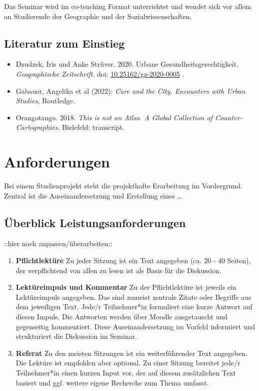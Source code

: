 \documentclass[
  ngerman,
]{article}
\providecommand{\tightlist}{%
  \setlength{\itemsep}{0pt}\setlength{\parskip}{0pt}}
\begin{document}
Das Seminar wird im co-teaching Format unterrichtet und wendet sich vor allem an Studierende der Geographie und der Sozialwissenschaften.

\hypertarget{literatur-zum-einstieg}{%
\subsection*{Literatur zum Einstieg}\label{literatur-zum-einstieg}}

\begin{itemize}
\tightlist
\item
  Dzudzek, Iris und Anke Strüver. 2020. Urbane Gesundheitsgerechtigkeit. \emph{Geographische Zeitschrift}. doi: \href{https://doi.org/10.25162/gz-2020-0005}{10.25162/gz-2020-0005} .
\item
  Gabauer, Angelika et al (2022): \emph{Care and the City. Encounters with Urban Studies}, Routledge.
\item
  Orangotango. 2018. \emph{This is not an Atlas. A Global Collection of Counter-Cartographies}. Bielefeld: transcript.
\end{itemize}

\hypertarget{anforderungen}{%
\section*{Anforderungen}\label{anforderungen}}

Bei einem Studienprojekt steht die projekthafte Erarbeitung im Vordergrund. Zentral ist die Auseinandersetzung und Erstellung eines \ldots{}

\hypertarget{uxfcberblick-leistungsanforderungen}{%
\subsection*{Überblick Leistungsanforderungen}\label{uxfcberblick-leistungsanforderungen}}

::hier noch anpassen/überarbeiten::

\begin{enumerate}
\def\labelenumi{\arabic{enumi}.}
\item
  \textbf{Pflichtlektüre} Zu jeder Sitzung ist ein Text angegeben (ca. 20 - 40 Seiten), der verpflichtend von allen zu lesen ist als Basis für die Diskussion.
\item
  \textbf{Lektüreimpuls und Kommentar} Zu der Pflichtlektüre ist jeweils ein Lektüreimpuls angegeben. Das sind zumeist zentrale Zitate oder Begriffe aus dem jeweiligen Text. Jede/r Teilnehmer*in formuliert eine kurze Antwort auf diesen Impuls. Die Antworten werden über Moodle ausgetauscht und gegenseitig kommentiert. Diese Auseinandersetzung im Vorfeld informiert und strukturiert die Diskussion im Seminar.
\item
  \textbf{Referat} Zu den meisten Sitzungen ist ein weiterführender Text angegeben. Die Lektüre ist empfohlen aber optional. Zu einer Sitzung bereitet jede/r Teilnehmer*in einen kurzen Input vor, der auf diesem zusätzlichen Text basiert und ggf. weitere eigene Recherche zum Thema umfasst.
\end{enumerate}
\end{document}

